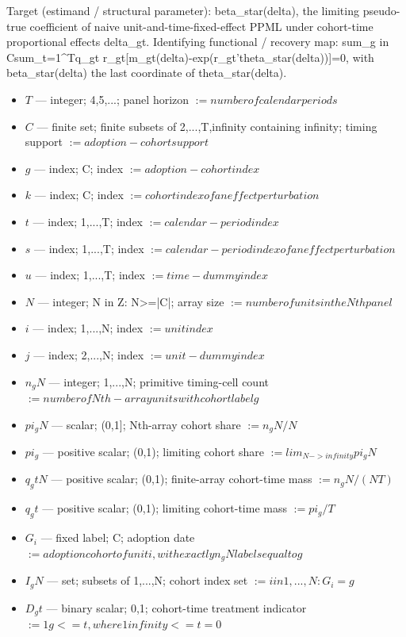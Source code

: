 \documentclass{article}
\begin{document}
Target (estimand / structural parameter): beta_star(delta), the limiting pseudo-true coefficient of naive unit-and-time-fixed-effect PPML under cohort-time proportional effects delta_gt.
Identifying functional / recovery map: sum_{g in C}sum_{t=1}^Tq_gt r_gt[m_gt(delta)-exp(r_gt'theta_star(delta))]=0, with beta_star(delta) the last coordinate of theta_star(delta).
\begin{itemize}
  \item $T$ --- integer; {4,5,...}; panel horizon $:= number of calendar periods$
  \item $C$ --- finite set; finite subsets of {2,...,T,infinity} containing infinity; timing support $:= adoption-cohort support$
  \item $g$ --- index; C; index $:= adoption-cohort index$
  \item $k$ --- index; C; index $:= cohort index of an effect perturbation$
  \item $t$ --- index; {1,...,T}; index $:= calendar-period index$
  \item $s$ --- index; {1,...,T}; index $:= calendar-period index of an effect perturbation$
  \item $u$ --- index; {1,...,T}; index $:= time-dummy index$
  \item $N$ --- integer; {N in Z: N>=|C|}; array size $:= number of units in the Nth panel$
  \item $i$ --- index; {1,...,N}; index $:= unit index$
  \item $j$ --- index; {2,...,N}; index $:= unit-dummy index$
  \item $n_gN$ --- integer; {1,...,N}; primitive timing-cell count $:= number of Nth-array units with cohort label g$
  \item $pi_gN$ --- scalar; (0,1]; Nth-array cohort share $:= n_gN/N$
  \item $pi_g$ --- positive scalar; (0,1); limiting cohort share $:= lim_{N->infinity} pi_gN$
  \item $q_gtN$ --- positive scalar; (0,1); finite-array cohort-time mass $:= n_gN/(NT)$
  \item $q_gt$ --- positive scalar; (0,1); limiting cohort-time mass $:= pi_g/T$
  \item $G_i$ --- fixed label; C; adoption date $:= adoption cohort of unit i, with exactly n_gN labels equal to g$
  \item $I_gN$ --- set; subsets of {1,...,N}; cohort index set $:= {i in {1,...,N}: G_i=g}$
  \item $D_gt$ --- binary scalar; {0,1}; cohort-time treatment indicator $:= 1{g<=t}, where 1{infinity<=t}=0$

\end{itemize}
\end{document}
